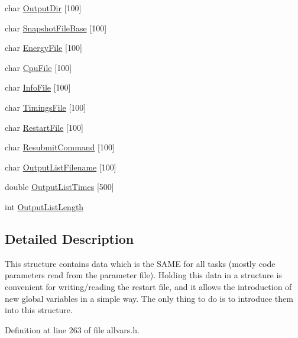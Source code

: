 \begin{DoxyCompactItemize}
\item 
char \hyperlink{structglobal__data__all__processes_aebda5d1b80cfb767b9668d7858c36bcc}{OutputDir} \mbox{[}100\mbox{]}
\item 
char \hyperlink{structglobal__data__all__processes_a4bcf5b5c31545691038015af9ae9acb3}{SnapshotFileBase} \mbox{[}100\mbox{]}
\item 
char \hyperlink{structglobal__data__all__processes_aa97394ab3a522c46b75f8b57a59ca0b5}{EnergyFile} \mbox{[}100\mbox{]}
\item 
char \hyperlink{structglobal__data__all__processes_ac2ba980c60460b89534ca8bba63cd679}{CpuFile} \mbox{[}100\mbox{]}
\item 
char \hyperlink{structglobal__data__all__processes_a3cbcdacb8b522288268993f0ce5b15ac}{InfoFile} \mbox{[}100\mbox{]}
\item 
char \hyperlink{structglobal__data__all__processes_ae0f7c691d211f8076374cc55271022e8}{TimingsFile} \mbox{[}100\mbox{]}
\item 
char \hyperlink{structglobal__data__all__processes_a67e197a37469217aa8ad32c42230b286}{RestartFile} \mbox{[}100\mbox{]}
\item 
char \hyperlink{structglobal__data__all__processes_a59f86964a3a1b03933a787cfc280951a}{ResubmitCommand} \mbox{[}100\mbox{]}
\item 
char \hyperlink{structglobal__data__all__processes_a063be13ecadec873ebaad1b3645a5323}{OutputListFilename} \mbox{[}100\mbox{]}
\item 
double \hyperlink{structglobal__data__all__processes_a7f3307450336a806e545661ba6c79ba5}{OutputListTimes} \mbox{[}500\mbox{]}
\item 
int \hyperlink{structglobal__data__all__processes_af0ada535a17b75233e0e0de6ff8fa448}{OutputListLength}
\end{DoxyCompactItemize}


\subsection{Detailed Description}
This structure contains data which is the SAME for all tasks (mostly code parameters read from the parameter file). Holding this data in a structure is convenient for writing/reading the restart file, and it allows the introduction of new global variables in a simple way. The only thing to do is to introduce them into this structure. 

Definition at line 263 of file allvars.h.



